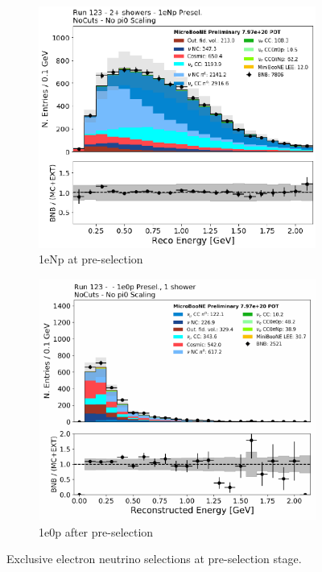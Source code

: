 \begin{figure}[H] 
\begin{center}
    \begin{subfigure}[b]{0.45\textwidth}
    \centering
    \includegraphics[width=1.00\textwidth]{Fakedata/set2/np_2shr.pdf}
    \caption{\label{fig:fakedata:set2:Np_presel_recoe} 1eNp at pre-selection}
    \end{subfigure}
    \begin{subfigure}[b]{0.45\textwidth}
    \centering
    \includegraphics[width=1.00\textwidth]{Fakedata/set2/zp_presel_recoe.pdf}
    \caption{\label{fig:fakedata:set2:2shr0p} 1e0p after pre-selection}
    \end{subfigure}
\caption{\label{fig:fakedata:set2:presel} Exclusive electron neutrino selections at pre-selection stage.}
\end{center}
\end{figure}

